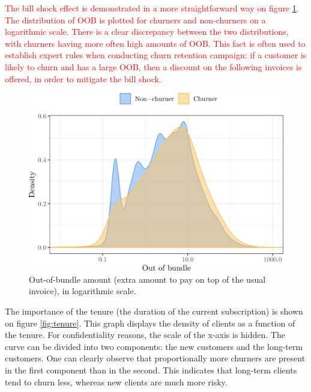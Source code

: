 \textcolor{red}{
The bill shock effect is demonstrated in a more straightforward way on figure
\ref{fig:oob}. The distribution of OOB is plotted for churners and
non-churners on a logarithmic scale. There is a clear discrepancy between the
two distributions, with churners having more often high amounts of OOB. This
fact is often used to establish expert rules when conducting churn retention
campaign: if a customer is likely to churn and has a large OOB, then a discount
on the following invoices is offered,  in order to mitigate the bill shock.
}

\begin{figure}
    \centering
	\includegraphics[width=0.9\linewidth]{figures/oob.png}
	\caption{Out-of-bundle amount (extra amount to pay on top of the usual
	invoice), in logarithmic scale.}
	\label{fig:oob}
\end{figure}

The importance of the tenure (the duration of the current subscription) is shown
on figure \ref{fig:tenure}. This graph displays the density of clients as a
function of the tenure. For confidentiality reasons, the scale of the x-axis is
hidden. The curve can be divided into two components: the new customers and the
long-term customers. One can clearly observe that proportionally more churners
are present in the first component than in the second. This indicates that
long-term clients tend to churn less, whereas new clients are much more risky.

